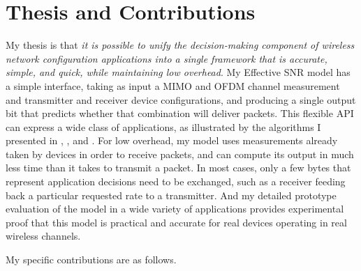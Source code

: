 \section{Thesis and Contributions}
My thesis is that \emph{it is possible to unify the decision-making component of wireless network configuration applications into a single framework that is accurate, simple, and quick, while maintaining low overhead}. My Effective SNR model has a simple interface, taking as input a MIMO and OFDM channel measurement and transmitter and receiver device configurations, and producing a single output bit that predicts whether that combination will deliver packets. This flexible API can express a wide class of applications, as illustrated by the algorithms I presented in , , and .  For low overhead, my model uses measurements already taken by devices in order to receive packets, and can compute its output in much less time than it takes to transmit a packet. In most cases, only a few bytes that represent application decisions need to be exchanged, such as a receiver feeding back a particular requested rate to a transmitter. And my detailed prototype evaluation of the model in a wide variety of applications provides experimental proof that this model is practical and accurate for real devices operating in real wireless channels.

My specific contributions are as follows.

